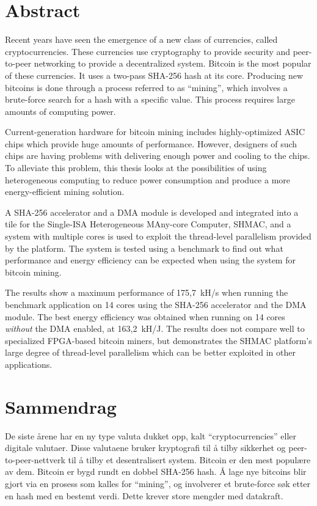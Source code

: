 \chapter*{Abstract}

Recent years have seen the emergence of a new class of currencies, called
cryptocurrencies. These currencies use cryptography to provide security
and peer-to-peer networking to provide a decentralized system. Bitcoin is
the most popular of these currencies. It uses a two-pass
SHA-256 hash at its core. Producing new bitcoins is done through a process
referred to as ``mining'', which involves a brute-force search for a hash with
a specific value. This process requires large amounts of computing power.

Current-generation hardware for bitcoin mining includes highly-optimized
ASIC chips which provide huge amounts of performance. However, designers of
such chips are having problems with delivering enough power and cooling
to the chips. To alleviate this problem, this thesis looks at the possibilities
of using heterogeneous computing to reduce power consumption and produce a more
energy-efficient mining solution.

A SHA-256 accelerator and a DMA module is developed and integrated into a tile for
the Single-ISA Heterogeneous MAny-core Computer, SHMAC, and a system with
multiple cores is used to exploit the thread-level parallelism provided by
the platform. The system is tested using a benchmark to find out what performance
and energy efficiency can be expected when using the system for bitcoin mining.

The results show a maximum performance of 175,7~kH/s when running the benchmark
application on 14 cores using the SHA-256 accelerator and the DMA module. The best
energy efficiency was obtained when running on 14 cores \emph{without} the DMA enabled,
at 163,2~kH/J. The results does not compare well to specialized FPGA-based
bitcoin miners, but demonstrates the SHMAC platform's large degree of thread-level parallelism
which can be better exploited in other applications.

\chapter*{Sammendrag}

De siste årene har en ny type valuta dukket opp, kalt ``cryptocurrencies'' eller digitale valutaer. Disse valutaene
bruker kryptografi til å tilby sikkerhet og peer-to-peer-nettverk til å tilby et
desentralisert system. Bitcoin er den mest populære av dem. Bitcoin er bygd rundt
en dobbel SHA-256 hash. Å lage nye bitcoins blir gjort via en prosess som kalles
for ``mining'', og involverer et brute-force søk etter en hash med en bestemt verdi.
Dette krever store mengder med datakraft.

